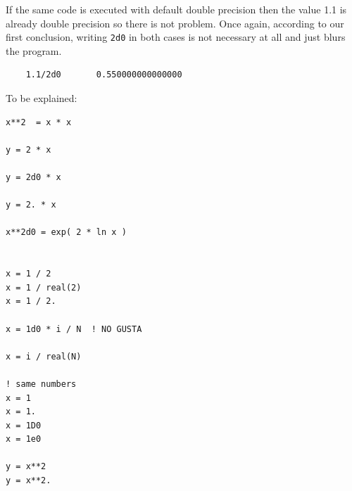 
If the same code is executed with default double precision then the value 1.1 is already double precision so there is not problem. Once again, according to our first conclusion, writing \texttt{2d0} in both cases is not necessary at all and just blurs the program.

\begin{verbatim}
    1.1/2d0       0.550000000000000
\end{verbatim}





To be explained:

\begin{verbatim} 
x**2  = x * x 

y = 2 * x 

y = 2d0 * x 

y = 2. * x 

x**2d0 = exp( 2 * ln x ) 


x = 1 / 2
x = 1 / real(2) 
x = 1 / 2. 

x = 1d0 * i / N  ! NO GUSTA 

x = i / real(N) 

! same numbers 
x = 1 
x = 1. 
x = 1D0 
x = 1e0 

y = x**2
y = x**2.

\end{verbatim} 





